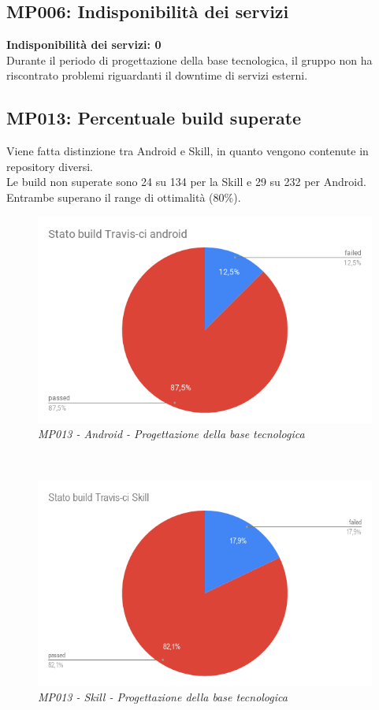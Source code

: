 \subsection{MP006: Indisponibilità dei servizi}
\textbf{Indisponibilità dei servizi: 0}\\
Durante il periodo di progettazione della base tecnologica, il gruppo non ha riscontrato problemi riguardanti il downtime di servizi esterni.

\subsection{MP013: Percentuale build superate}
Viene fatta distinzione tra Android e Skill, in quanto vengono contenute in repository diversi.\\
Le build non superate sono 24 su 134 per la Skill e 29 su 232 per Android. Entrambe superano il range di ottimalità (80\%).
\begin{figure} [h]
    \centering
	\includegraphics[scale=0.5]{./images/StatobuildTravis-ciandroid.png}
    \caption{\textit{MP013 - Android - Progettazione della base tecnologica}}\label{}
\end{figure}\\
\begin{figure} [h]
    \centering
	\includegraphics[scale=0.5]{./images/StatobuildTravis-ciSkill.png}
    \caption{\textit{MP013 - Skill - Progettazione della base tecnologica}}\label{}
\end{figure}
\clearpage

